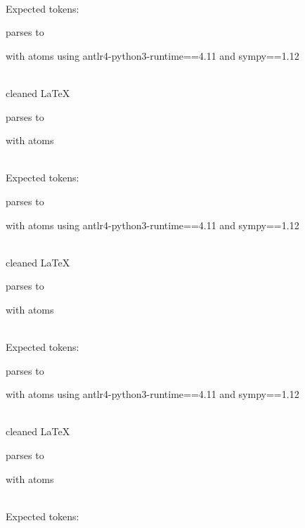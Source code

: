 \documentclass{article}
\begin{document}
\ \\
Expected tokens:


\hrulefill


parses to

with atoms
using antlr4-python3-runtime==4.11 and sympy==1.12

\ \\
cleaned \LaTeX

parses to

with atoms


\ \\
Expected tokens:



\hrulefill


parses to

with atoms
using antlr4-python3-runtime==4.11 and sympy==1.12

\ \\
cleaned \LaTeX

parses to

with atoms


\ \\
Expected tokens:



\hrulefill


parses to

with atoms
using antlr4-python3-runtime==4.11 and sympy==1.12

\ \\
cleaned \LaTeX

parses to

with atoms


\ \\
Expected tokens:


\hrulefill
\end{document}
